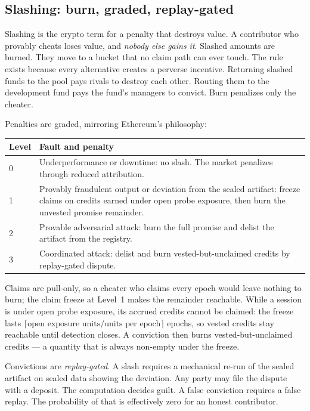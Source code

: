 \documentclass[11pt]{article}
\begin{document}
\subsection{Slashing: burn, graded, replay-gated}

Slashing is the crypto term for a penalty that destroys value. A
contributor who provably cheats loses value, and \emph{nobody else
gains it}. Slashed amounts are burned. They move to a bucket that
no claim path can ever touch. The rule exists because every
alternative creates a perverse incentive. Returning slashed funds
to the pool pays rivals to destroy each other. Routing them to the
development fund pays the fund's managers to convict. Burn
penalizes only the cheater.

Penalties are graded, mirroring Ethereum's philosophy:

\begin{center}
\begin{tabular}{@{}p{3.4cm}p{7.6cm}@{}}
\toprule
\textbf{Level} & \textbf{Fault and penalty} \\
\midrule
0 & Underperformance or downtime: no slash. The market penalizes
through reduced attribution. \\
1 & Provably fraudulent output or deviation from the sealed
artifact: freeze claims on credits earned under open probe
exposure, then burn the unvested promise remainder. \\
2 & Provable adversarial attack: burn the full promise and delist
the artifact from the registry. \\
3 & Coordinated attack: delist and burn vested-but-unclaimed
credits by replay-gated dispute. \\
\bottomrule
\end{tabular}
\end{center}

Claims are pull-only, so a
cheater who claims every epoch would leave nothing to burn; the
claim freeze at Level~1 makes the remainder reachable. While a
session is under open probe exposure, its accrued credits cannot
be claimed: the freeze lasts
$\lceil \text{open exposure units} / \text{units per epoch}
\rceil$ epochs, so vested credits stay reachable until detection
closes. A conviction then burns vested-but-unclaimed credits ---
a quantity that is always non-empty under the freeze.

Convictions are \emph{replay-gated}. A slash requires a mechanical
re-run of the sealed artifact on sealed data showing the
deviation. Any party may file the dispute with a deposit. The
computation decides guilt. A false conviction requires a false
replay. The probability of that is effectively zero for an honest
contributor.
\end{document}
